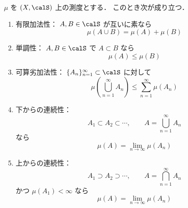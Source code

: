 \begin{proposition}[測度の基本性質]
$\mu$ を $(X,\calS)$ 上の測度とする．
このとき次が成り立つ．
\begin{enumerate}
    \item 有限加法性：
    $A,B \in \calS$ が互いに素なら
    \[
    \mu(A\cup B)=\mu(A)+\mu(B)
    \]
    \item 単調性：
    $A,B \in \calS$ で $A \subset B$ なら
    \[
    \mu(A)\le \mu(B)
    \]
    \item 可算劣加法性：
    $\{A_n\}_{n=1}^{\infty}\subset\calS$ に対して
    \[
    \mu\left(\bigcup_{n=1}^{\infty}A_n\right)
    \le
    \sum_{n=1}^{\infty}\mu(A_n)
    \]
    \item 下からの連続性：
    \[
    A_1\subset A_2\subset \cdots,\qquad A=\bigcup_{n=1}^{\infty}A_n
    \]
    なら
    \[
    \mu(A)=\lim_{n\to\infty}\mu(A_n)
    \]
    \item 上からの連続性：
    \[
    A_1\supset A_2\supset \cdots,\qquad A=\bigcap_{n=1}^{\infty}A_n
    \]
    かつ $\mu(A_1)<\infty$ なら
    \[
    \mu(A)=\lim_{n\to\infty}\mu(A_n)
    \]
\end{enumerate}
\end{proposition}

